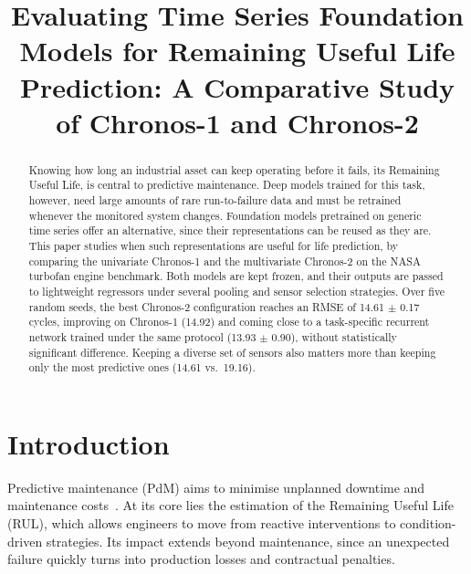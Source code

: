 \documentclass{svproc}
\begin{document}
\mainmatter

\title{Evaluating Time Series Foundation Models for Remaining Useful Life
Prediction: A Comparative Study of Chronos-1 and Chronos-2}
\author{}
\institute{}
\maketitle

\begin{abstract}
Knowing how long an industrial asset can keep operating before it fails,
its Remaining Useful Life, is central to predictive maintenance. Deep
models trained for this task, however, need large amounts of rare
run-to-failure data and must be retrained whenever the monitored system
changes. Foundation models pretrained on generic time series offer an
alternative, since their representations can be reused as they are. This
paper studies when such representations are useful for life prediction,
by comparing the univariate Chronos-1 and the multivariate Chronos-2 on
the NASA turbofan engine benchmark. Both models are kept frozen, and
their outputs are passed to lightweight regressors under several pooling
and sensor selection strategies. Over five random seeds, the best Chronos-2 configuration reaches an RMSE
of 14.61 $\pm$ 0.17 cycles, improving on Chronos-1 (14.92) and coming close
to a task-specific recurrent network trained under the same protocol
(13.93 $\pm$ 0.90), without statistically significant difference. Keeping a diverse set of sensors also matters more than keeping
only the most predictive ones (14.61 vs.\ 19.16).
\end{abstract}

\section{Introduction}

Predictive maintenance (PdM) aims to minimise unplanned downtime and
maintenance costs~\cite{khan2018}. At its core lies the estimation of the
Remaining Useful Life (RUL), which allows engineers to move from reactive
interventions to condition-driven strategies. Its impact extends
beyond maintenance, since an unexpected failure quickly turns into
production losses and contractual penalties.
\end{document}
